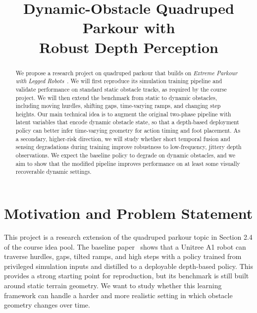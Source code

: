 \documentclass[conference]{IEEEtran}
\begin{document}
\title{Dynamic-Obstacle Quadruped Parkour with\\Robust Depth Perception}

\author{
}

\maketitle

\begin{abstract}
   We propose a research project on quadruped parkour that builds on \emph{Extreme Parkour with Legged Robots}~\citep{cheng2023parkour}. We will first reproduce its simulation training pipeline and validate performance on standard static obstacle tracks, as required by the course project. We will then extend the benchmark from static to dynamic obstacles, including moving hurdles, shifting gaps, time-varying ramps, and changing step heights. Our main technical idea is to augment the original two-phase pipeline with latent variables that encode dynamic obstacle state, so that a depth-based deployment policy can better infer time-varying geometry for action timing and foot placement. As a secondary, higher-risk direction, we will study whether short temporal fusion and sensing degradations during training improve robustness to low-frequency, jittery depth observations. We expect the baseline policy to degrade on dynamic obstacles, and we aim to show that the modified pipeline improves performance on at least some visually recoverable dynamic settings.
\end{abstract}

\section{Motivation and Problem Statement}
This project is a research extension of the quadruped parkour topic in Section 2.4 of the course idea pool. The baseline paper~\citep{cheng2023parkour} shows that a Unitree A1 robot can traverse hurdles, gaps, tilted ramps, and high steps with a policy trained from privileged simulation inputs and distilled to a deployable depth-based policy. This provides a strong starting point for reproduction, but its benchmark is still built around static terrain geometry. We want to study whether this learning framework can handle a harder and more realistic setting in which obstacle geometry changes over time.
\end{document}
